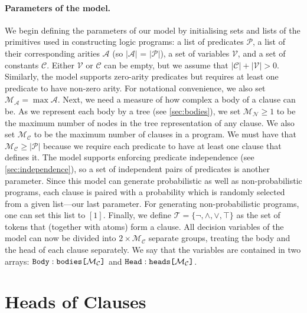 \documentclass[runningheads]{llncs}
\newcommand{\variable}[1]{\texttt{\textup{#1}}}
\newcommand{\arrayt}[3]{\variable{{#3}} : \variable{{#1}[}{#2}\variable{]}}
\newcommand{\predicates}{\mathcal{P}}
\newcommand{\variables}{\mathcal{V}}
\newcommand{\constants}{\mathcal{C}}
\newcommand{\tokens}{\mathcal{T}}
\newcommand{\arities}{\mathcal{A}}
\newcommand{\maxArity}{\mathcal{M}_{\mathcal{A}}}
\newcommand{\maxNumNodes}{\mathcal{M}_{\mathcal{N}}}
\newcommand{\maxNumClauses}{\mathcal{M}_{\mathcal{C}}}
\begin{document}
\paragraph{Parameters of the model.} We begin defining the parameters of our
model by initialising sets and lists of the primitives used in constructing
logic programs: a list of predicates $\predicates{}$, a list of their
corresponding arities $\arities{}$ (so $|\arities{}|$ = $|\predicates{}|$), a
set of variables $\variables{}$, and a set of constants $\constants{}$. Either
$\variables{}$ or $\constants{}$ can be empty, but we assume that
$|\constants{}| + |\variables{}| > 0$. Similarly, the model supports zero-arity
predicates but requires at least one predicate to have non-zero arity. For
notational convenience, we also set $\maxArity{} = \max \arities{}$. Next, we
need a measure of how complex a body of a clause can be. As we represent each
body by a tree (see \cref{sec:bodies}), we set $\maxNumNodes{} \ge 1$ to
be the maximum number of nodes in the tree representation of any clause. We also
set $\maxNumClauses{}$ to be the maximum number of clauses in a program. We must
have that $\maxNumClauses{} \ge |\predicates{}|$ because we require each
predicate to have at least one clause that defines it. The model supports
enforcing predicate independence (see \cref{sec:independence}), so a set of
independent pairs of predicates is another parameter. Since this model can
generate probabilistic as well as non-probabilistic programs, each clause is
paired with a probability which is randomly selected from a given list---our
last parameter. For generating non-probabilistic programs, one can set this list
to $[1]$. Finally, we define $\tokens{} = \{ \neg, \land, \lor, \top \}$ as the
set of tokens that (together with atoms) form a clause. All decision variables
of the model can now be divided into $2 \times \maxNumClauses{}$ separate
groups, treating the body and the head of each clause separately. We say that
the variables are contained in two arrays:
$\arrayt{bodies}{\maxNumClauses{}}{Body}$ and
$\arrayt{heads}{\maxNumClauses{}}{Head}$.

\section{Heads of Clauses} \label{sec:heads}
\end{document}
